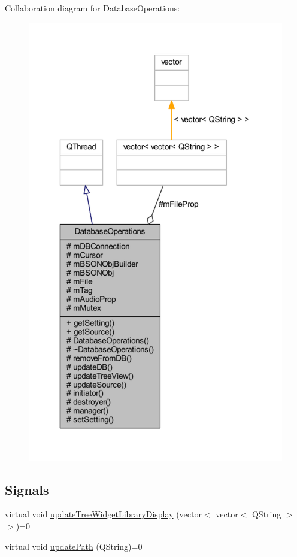 Collaboration diagram for Database\-Operations\-:
\nopagebreak
\begin{figure}[H]
\begin{center}
\leavevmode
\includegraphics[width=317pt]{class_database_operations__coll__graph}
\end{center}
\end{figure}
\subsection*{Signals}
\begin{DoxyCompactItemize}
\item 
virtual void \hyperlink{class_database_operations_a31fab20336d2bb54e41983b4db5a87cc}{update\-Tree\-Widget\-Library\-Display} (vector$<$ vector$<$ Q\-String $>$ $>$)=0
\item 
virtual void \hyperlink{class_database_operations_ad920f83b72e1184bc844cc5002b2c13a}{update\-Path} (Q\-String)=0
\end{DoxyCompactItemize}
